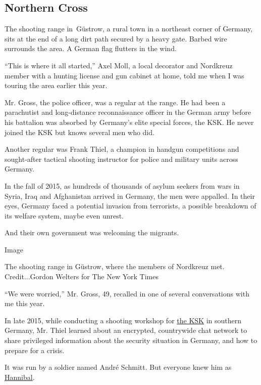 \hypertarget{northern-cross}{%
\subsection{Northern Cross}\label{northern-cross}}

The shooting range in~Güstrow, a rural town in a northeast corner of
Germany, sits at the end of a long dirt path secured by a heavy gate.
Barbed wire surrounds the area. A German flag flutters in the wind.

``This is where it all started,'' Axel Moll, a local decorator and
Nordkreuz member with a hunting license and gun cabinet at home, told me
when I was touring the area earlier this year.

Mr. Gross, the police officer, was a regular at the range. He had been a
parachutist and long-distance reconnaissance officer in the German army
before his battalion was absorbed by Germany's elite special forces, the
KSK. He never joined the KSK but knows several men who did.

Another regular was Frank Thiel, a champion in handgun competitions and
sought-after tactical shooting instructor for police and military units
across Germany.

In the fall of 2015, as hundreds of thousands of asylum seekers from
wars in Syria, Iraq and Afghanistan arrived in Germany, the men were
appalled. In their eyes, Germany faced a potential invasion from
terrorists, a possible breakdown of its welfare system, maybe even
unrest.

And their own government was welcoming the migrants.

Image

The shooting range in Güstrow, where the members of Nordkreuz met.
Credit...Gordon Welters for The New York Times

``We were worried,'' Mr. Gross, 49, recalled in one of several
conversations with me this year.

In late 2015, while conducting a shooting workshop for
\href{https://www.nytimes3xbfgragh.onion/2020/07/03/world/europe/germany-military-neo-nazis-ksk.html?searchResultPosition=2}{the
KSK} in southern Germany, Mr. Thiel learned about an encrypted,
countrywide chat network to share privileged information about the
security situation in Germany, and how to prepare for a crisis.

It was run by a soldier named André Schmitt. But everyone knew him as
\href{https://www.nytimes3xbfgragh.onion/2020/07/03/world/europe/germany-military-neo-nazis-ksk.html?searchResultPosition=1}{Hannibal}.

